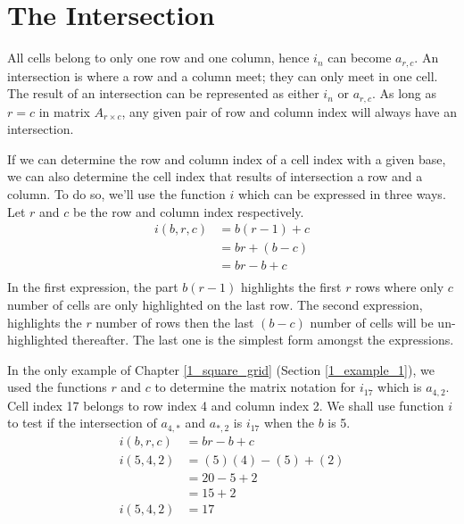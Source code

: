 \documentclass[letterpaper, twoside,12pt]{article}
\begin{document}
    \newpage

    \section{The Intersection} \label{intersection}
    All cells belong to only one row and one column, hence $i_n$ can become $a_{r,c}$. An intersection is where a row and a column meet; they can only meet in one cell. The result of an intersection can be represented as either $i_n$ or $a_{r,c}$. As long as $r=c$ in matrix $A_{r \times c}$, any given pair of row and column index will always have an intersection.

    If we can determine the row and column index of a cell index with a given base, we can also determine the cell index that results of intersection a row and a column. To do so, we'll use the function $i$ which can be expressed in three ways. Let $r$ and $c$ be the row and column index respectively.
    \begin{equation}
        \begin{split}
            i(b,r,c) &= b(r-1) + c \\
                    &= br + (b - c) \\
                    &= br - b + c \\
        \end{split}
    \end{equation}
    In the first expression, the part $b(r-1)$ highlights the first $r$ rows where only $c$ number of cells are only highlighted on the last row. The second expression, highlights the $r$ number of rows then the last $(b - c)$ number of cells will be un-highlighted thereafter. The last one is the simplest form amongst the expressions.

    In the only example of Chapter \ref{1_square_grid} (Section \ref{1_example_1}), we used the functions $r$ and $c$ to determine the matrix notation for $i_{17}$ which is $a_{4,2}$. Cell index 17 belongs to row index 4 and column index 2. We shall use function $i$ to test if the intersection of $a_{4,*}$ and $a_{*,2}$ is $i_{17}$ when the $b$ is 5.
    \begin{equation*}
        \begin{split}
            i(b,r,c) &= br - b + c \\
            i(5,4,2) &= (5)(4) - (5) + (2) \\
                &= 20 - 5 + 2 \\
                &= 15 + 2 \\
            i(5,4,2) &= 17
        \end{split}
    \end{equation*}
\end{document}

